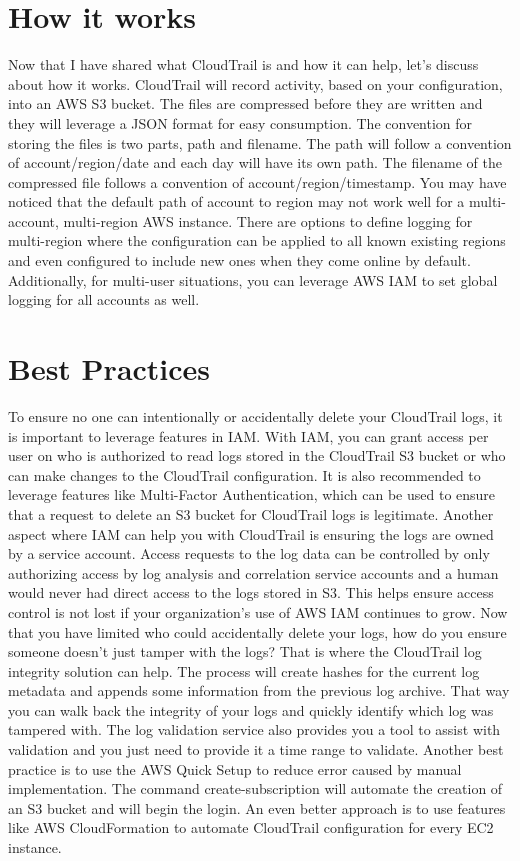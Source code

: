 \section{How it works}

Now that I have shared what CloudTrail is and how it can help, let’s discuss about how it works. CloudTrail will record activity, based on your configuration, into an AWS S3 bucket. The files are compressed before they are written and they will leverage a JSON format for easy consumption. The convention for storing the files is two parts, path and filename. The path will follow a convention of account/region/date and each day will have its own path.  The filename of the compressed file follows a convention of account/region/timestamp. 
You may have noticed that the default path of account to region may not work well for a multi-account, multi-region AWS instance. There are options to define logging for multi-region where the configuration can be applied to all known existing regions and even configured to include new ones when they come online by default. Additionally, for multi-user situations, you can leverage AWS IAM to set global logging for all accounts as well.

\section{Best Practices}

To ensure no one can intentionally or accidentally delete your CloudTrail logs, it is important to leverage features in IAM. With IAM, you can grant access per user on who is authorized to read logs stored in the CloudTrail S3 bucket or who can make changes to the CloudTrail configuration. It is also recommended to leverage features like Multi-Factor Authentication, which can be used to ensure that a request to delete an S3 bucket for CloudTrail logs is legitimate. 
Another aspect where IAM can help you with CloudTrail is ensuring the logs are owned by a service account. Access requests to the log data can be controlled by only authorizing access by log analysis and correlation service accounts and a human would never had direct access to the logs stored in S3. This helps ensure access control is not lost if your organization’s use of AWS IAM continues to grow. 
Now that you have limited who could accidentally delete your logs, how do you ensure someone doesn’t just tamper with the logs? That is where the CloudTrail log integrity solution can help. The process will create hashes for the current log metadata and appends some information from the previous log archive. That way you can walk back the integrity of your logs and quickly identify which log was tampered with. The log validation service also provides you a tool to assist with validation and you just need to provide it a time range to validate.
Another best practice is to use the AWS Quick Setup to reduce error caused by manual implementation. The command create-subscription will automate the creation of an S3 bucket and will begin the login. An even better approach is to use features like AWS CloudFormation to automate CloudTrail configuration for every EC2 instance.

